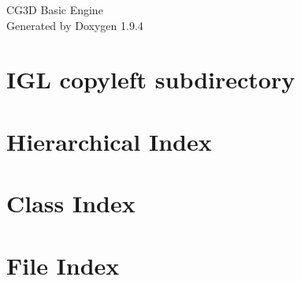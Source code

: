 \documentclass[twoside]{book}
\newcommand{\+}{\discretionary{\mbox{\scriptsize$\hookleftarrow$}}{}{}}
\newcommand{\clearemptydoublepage}{%
    \newpage{\pagestyle{empty}\cleardoublepage}%
  }
\begin{document}
  \raggedbottom
    \hypersetup{pageanchor=false,
                bookmarksnumbered=true,
                pdfencoding=unicode
               }
  \begin{titlepage}
  \vspace*{7cm}
  \begin{center}%
  {\Large CG3\+D Basic Engine}\\
  \vspace*{1cm}
  {\large Generated by Doxygen 1.9.4}\\
  \end{center}
  \end{titlepage}
  \clearemptydoublepage
  \tableofcontents
  \clearemptydoublepage
  \hypersetup{pageanchor=true}
\chapter{IGL copyleft subdirectory}
\label{md_igl_copyleft__r_e_a_d_m_e}

\chapter{Hierarchical Index}

\chapter{Class Index}

\chapter{File Index}

\end{document}
